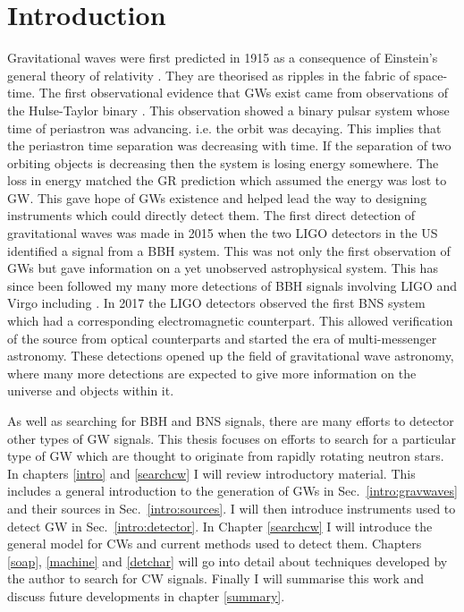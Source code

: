 \chapter{\label{intro}Introduction}


Gravitational waves were first predicted in 1915 as a consequence of Einstein's general theory of relativity \citep{einstein2005GrundlageAllgemeinen}.
They are theorised as ripples in the fabric of space-time.
The first observational evidence that \glspl{GW} exist came from observations of the Hulse-Taylor binary \citep{weisberg1981GravitationalWaves,weisberg2004RelativisticBinary}. 
This observation showed a binary pulsar system whose time of periastron was advancing. i.e. the orbit was decaying. 
This implies that the periastron time separation was decreasing with time. 
If the separation of two orbiting objects is decreasing then the system is losing energy somewhere.
The loss in energy matched the \gls{GR} prediction which assumed the energy was lost to \gls{GW}.
This gave hope of \glspl{GW} existence and helped lead the way to designing instruments which could directly detect them.
The first direct detection of gravitational waves was made in 2015 when the two \gls{LIGO} detectors in the US \citep{abbott2016ObservationGravitational} identified a signal from a \gls{BBH} system.
This was not only the first observation of \glspl{GW} but gave information on a yet unobserved astrophysical system.
This has since been followed my many more detections of \gls{BBH} signals involving \gls{LIGO} and Virgo including \citep{abbott2017GW170814ThreeDetector,theligoscientificcollaboration2020GW190425Observation}.
In 2017 the \gls{LIGO} detectors observed the first \gls{BNS} system \citep{abbott2017GW170817Observation} which had a corresponding electromagnetic counterpart.
This allowed verification of the source from optical counterparts and started the era of multi-messenger astronomy.
These detections opened up the field of gravitational wave astronomy, where many more detections are expected to give more information on the universe and objects within it.

As well as searching for \gls{BBH} and \gls{BNS} signals, there are many efforts to detector other types of \gls{GW} signals. 
This thesis focuses on efforts to search for a particular type of \gls{GW} which are thought to originate from rapidly rotating neutron stars.
In chapters \ref{intro} and \ref{searchcw} I will review introductory material. 
This includes a general introduction to the generation of \glspl{GW} in Sec.~\ref{intro:gravwaves} and their sources in Sec.~\ref{intro:sources}.
I will then introduce instruments used to detect \gls{GW} in Sec.~\ref{intro:detector}.
In Chapter \ref{searchcw} I will introduce the general model for \glspl{CW} and current methods used to detect them.
Chapters \ref{soap}, \ref{machine} and \ref{detchar} will go into detail about techniques developed by the author to search for \gls{CW} signals. 
Finally I will summarise this work and discuss future developments in chapter \ref{summary}.


